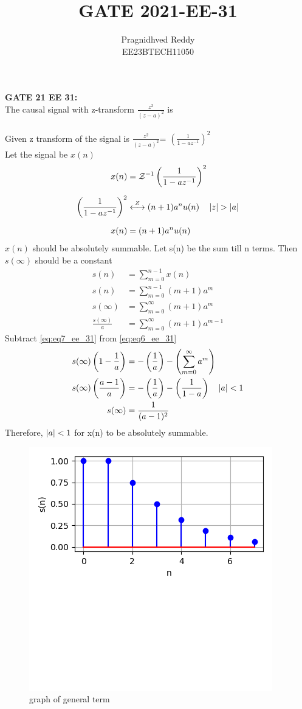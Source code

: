 \documentclass[journal,12pt,twocolumn]{IEEEtran}
\title{GATE 2021-EE-31}
\author{Pragnidhved Reddy\\EE23BTECH11050}
\date{}
\begin{document}
\maketitle
\newpage
\bigskip
\textbf{GATE 21 EE 31:}\\
The causal signal with z-transform $\frac{z^2}{(z-a)^{2}}$  is \\
\solution\\
Given z transform of the signal is $\frac{z^2}{(z-a)^{2}}$= $\left(\frac{1}{1-az^{-1}}\right)^2$\\
Let the signal be $x(n)$
\begin{align}
x(n)&=\mathcal{Z}^{-1}\left(\frac{1}{1-az^{-1}}\right)^2\\[6pt]
\left(\frac{1}{1-az^{-1}}\right)^2&\overset{Z}\longleftrightarrow (n+1)a^nu(n)\quad \left\vert z\right\vert>\left\vert a\right\vert\\[6pt] 
x(n)&=(n+1)a^n u(n)
\end{align}
$x(n)$ should be absolutely summable. Let s(n) be the sum till n terms. Then $s(\infty)$ should be a constant
\begin{align}
s(n)&=\sum_{m=0}^{n-1}x(n)\\
s(n)&=\sum_{m=0}^{n-1}(m+1)a^m\\
\label{eq:eq6_ee_31}
s(\infty)&=\sum_{m=0}^{\infty}(m+1)a^m\\
\label{eq:eq7_ee_31}
\frac{s(\infty)}{a}&=\sum_{m=0}^{\infty}(m+1)a^{m-1}
\end{align}
Subtract \eqref{eq:eq7_ee_31} from \eqref{eq:eq6_ee_31}
\begin{align}
s(\infty)\left(1-\frac{1}{a}\right)&=-\left(\frac{1}{a}\right)-\left(\sum_{m=0}^{\infty}a^{m}\right)\\
s(\infty)\left(\frac{a-1}{a}\right)&=-\left(\frac{1}{a}\right)-\left(\frac{1}{1-a}\right) \quad \left\vert a\right\vert<1\\
s(\infty)&=\frac{1}{(a-1)^2}
\end{align}
Therefore, $\left\vert a\right\vert<1$ for x(n) to be absolutely summable.
\begin{figure}[h!]
    \centering
    \includegraphics[width=\columnwidth]{figs/plot.png}
    \caption{graph of general term}
    \label{fig:1}
\end{figure}
\end{document}
